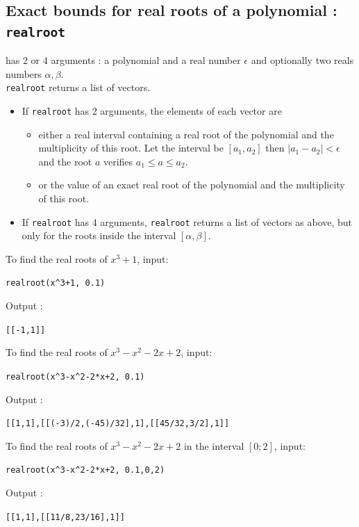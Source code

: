 \documentclass[a4paper,11pt]{book}
\begin{document}
\subsection{Exact bounds for real roots of a polynomial : {\tt realroot}}
 has 2 or 4 arguments : a polynomial and a real number 
$\epsilon$ and optionally two reals numbers $\alpha,\beta$.\\
{\tt realroot} returns a list of vectors.
\begin{itemize}
\item If {\tt realroot} has 2 arguments, the elements of each vector are
\begin{itemize}
\item 
either a real interval containing a real root of the polynomial 
and the multiplicity of this root.
Let the interval be $[a_1,a_2]$ then $|a_1-a_2|<\epsilon$ and 
the root $a$ verifies $a_1\leq a \leq a_2$.
\item or the value of an exact real root of the
polynomial and the multiplicity of this root.
\end{itemize}
\item If {\tt realroot} has 4 arguments, {\tt realroot} returns a list of
vectors as above, but only for the roots inside
the interval $[\alpha,\beta]$.
\end{itemize}
To find the real roots of $x^3+1$, input:
\begin{center}{\tt realroot(x\verb|^|3+1, 0.1)}\end{center}
Output :
\begin{center}{\tt [[-1,1]] }\end{center} 
To find the real roots of $x^3-x^2-2x+2$, input:
\begin{center}{\tt realroot(x\verb|^|3-x\verb|^|2-2*x+2, 0.1)}\end{center}
Output :
\begin{center}{\tt [[1,1],[[(-3)/2,(-45)/32],1],[[45/32,3/2],1]]}\end{center} 
To find the real roots of $x^3-x^2-2x+2$ in the interval $[0;2]$, input:
\begin{center}{\tt realroot(x\verb|^|3-x\verb|^|2-2*x+2, 0.1,0,2)}\end{center}
Output :
\begin{center}{\tt [[1,1],[[11/8,23/16],1]]}\end{center} 
\end{document}
